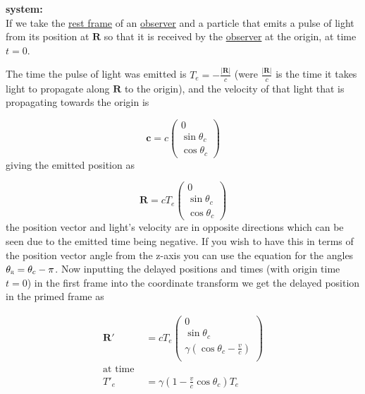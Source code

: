 \noindent
\textbf{system:} \\
If we take the \hyperlink{def-proper-frame}{rest frame} of an \hyperlink{def-observer}{observer} and a particle that emits a pulse of light from its position at $\mathbf{R}$ so that it is received by the \hyperlink{def-observer}{observer} at the origin, at time $t=0$.

The time the pulse of light was emitted is $T_{e}= -\frac{|\mathbf{R}|}{c}$ (were $\frac{|\mathbf{R}|}{c}$ is the time it takes light to propagate along $\mathbf{R}$ to the origin), and the velocity of that light that is propagating towards the origin is

\begin{equation}%
	\mathbf{c} = c
	\begin{pmatrix}
		0 \\ \sin{\theta_c} \\ \cos{\theta_c}
	\end{pmatrix}
\end{equation}%
giving the emitted position as

\begin{equation}%
	\mathbf{R} =  c T_{e}
	\begin{pmatrix}
		0 \\ \sin{\theta_c} \\ \cos{\theta_c}
	\end{pmatrix}
\end{equation}%
the position vector and light's velocity are in opposite directions which can be seen due to the emitted time being negative. If you wish to have this in terms of the position vector angle from the z-axis you can use the equation for the angles $\theta_{\scalebox{0.5}{R}} = \theta_c - \pi$. Now inputting the delayed positions and times (with origin time $t=0$) in the first frame into the coordinate transform we get the delayed position in the primed frame as

\begin{equation}%
	\begin{aligned}
		\mathbf{R}'
		 & = cT_{e}
		\begin{pmatrix}
			0
			\\ \sin{\theta_c}
			\\ \gamma \left( \cos{\theta_c} - \frac{v}{c} \right)
			\\
		\end{pmatrix}
		\\ \text{at time }
		 &
		\\ T'_{e}
		 & =
		\gamma (1-\frac{v}{c}  \cos{\theta_c} ) T_{e}
	\end{aligned}
\end{equation}%

